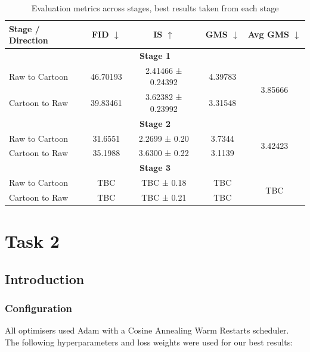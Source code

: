 \documentclass[twoside,english,notitlepage]{report}
\begin{document}
\begin{table}[h]
    \centering
    \begin{tabular}{|l|c|c|c|c|}
    \hline
    \textbf{Stage / Direction} & \textbf{FID} $\downarrow$ & \textbf{IS} $\uparrow$ & \textbf{GMS} $\downarrow$ & \textbf{Avg GMS} $\downarrow$ \\
    \hline
    \multicolumn{5}{|c|}{\textbf{Stage 1}} \\
    \hline
    Raw to Cartoon     & 46.70193     & 2.41466 ± 0.24392   & 4.39783    & \multirow{2}{*}{3.85666} \\
    Cartoon to Raw     & 39.83461         & 3.62382 ± 0.23992        & 3.31548        &            \\
    \hline
    \multicolumn{5}{|c|}{\textbf{Stage 2}} \\
    \hline
    Raw to Cartoon     & 31.6551     & 2.2699 ± 0.20   & 3.7344    & \multirow{2}{*}{3.42423} \\
    Cartoon to Raw     & 35.1988     & 3.6300 ± 0.22   & 3.1139    &            \\
    \hline
    \multicolumn{5}{|c|}{\textbf{Stage 3}} \\
    \hline
    Raw to Cartoon     & TBC     & TBC ± 0.18   & TBC    & \multirow{2}{*}{TBC} \\
    Cartoon to Raw     & TBC     & TBC ± 0.21   & TBC    &            \\
    \hline
    \end{tabular}
    \caption{Evaluation metrics across stages, best results taken from each stage}
    \label{tab:staged-eval}
\end{table}



\chapter{Task 2}
\section{Introduction}



\subsection{Configuration}\label{task2:configuration}

All optimisers used Adam with a Cosine Annealing Warm Restarts scheduler. The following hyperparameters and loss weights were used for our best results:
\end{document}
